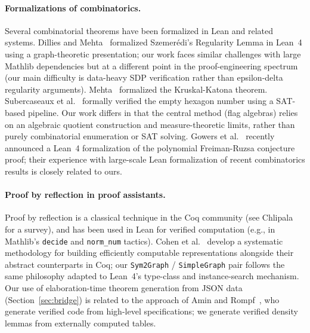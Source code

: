 \documentclass{article}
\newcommand{\lean}[1]{\texttt{#1}}
\begin{document}
\paragraph{Formalizations of combinatorics.}
Several combinatorial theorems have been formalized in Lean and related
systems.  Dillies and Mehta~\cite{dillies2022szemeredi} formalized
Szemer\'edi's Regularity Lemma in Lean~4 using a graph-theoretic presentation;
our work faces similar challenges with large Mathlib dependencies but at a
different point in the proof-engineering spectrum (our main difficulty is
data-heavy SDP verification rather than epsilon-delta regularity arguments).
Mehta~\cite{mehta2022kruskal} formalized the Kruskal-Katona theorem.
Subercaseaux et al.~\cite{subercaseaux2024hexagon} formally verified the
empty hexagon number using a SAT-based pipeline.  Our work differs in that
the central method (flag algebras) relies on an algebraic quotient
construction and measure-theoretic limits, rather than purely combinatorial
enumeration or SAT solving.  Gowers et al.~\cite{gowers2024formalizing}
recently announced a Lean~4 formalization of the polynomial Freiman-Ruzsa
conjecture proof; their experience with large-scale Lean formalization of
recent combinatorics results is closely related to ours.

\paragraph{Proof by reflection in proof assistants.}
Proof by reflection is a classical technique in the Coq community (see
Chlipala~\cite{chlipala2013cpdt} for a survey), and has been used in Lean
for verified computation (e.g., in Mathlib's \lean{decide} and
\lean{norm\_num} tactics).  Cohen et al.~\cite{cohen2013refinements} develop
a systematic methodology for building efficiently computable representations
alongside their abstract counterparts in Coq; our \lean{Sym2Graph} /
\lean{SimpleGraph} pair follows the same philosophy adapted to Lean~4's
type-class and instance-search mechanism.  Our use of elaboration-time
theorem generation from JSON data (Section~\ref{sec:bridge}) is related to
the approach of Amin and Rompf~\cite{amin2017collapsing}, who generate
verified code from high-level specifications; we generate verified density
lemmas from externally computed tables.
\end{document}
